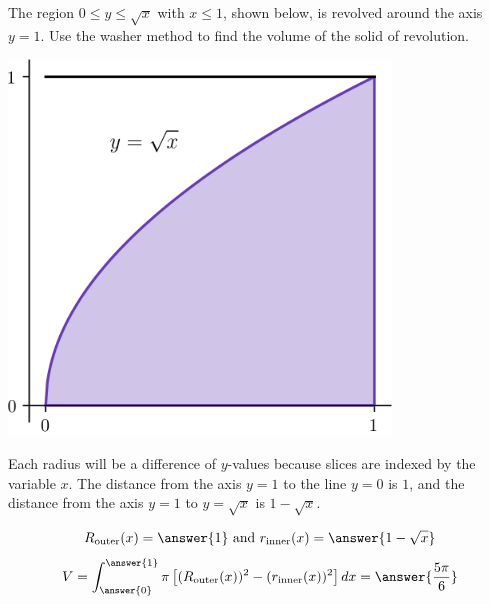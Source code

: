 \documentclass{ximera}
\begin{document}
\begin{problem}
The region $0 \leq y \leq \sqrt{x}$ with $x \leq 1$, shown below, is revolved around the axis $y=1$. Use the washer method to find the volume of the solid of revolution.
\begin{center}
\begin{image}
\includegraphics[width=4in]{diskwasher/disk03.png}
\end{image}
\end{center}
\begin{hint}
Each radius will be a difference of $y$-values because slices are indexed by the variable $x$.
The distance from the axis $y=1$ to the line $y=0$ is $1$, and the distance from the axis $y=1$ to $y = \sqrt{x}$ is $1 - \sqrt{x}$.
\end{hint}
\begin{prompt}
\[ R_{\mathrm{outer}} (x) = \answer{1} \text{ and } r_{\mathrm{inner}}(x) = \answer{1-\sqrt{x}} \]
\[ V = \int_{\answer{0}}^{\answer{1}} \pi  \left[ (R_{\mathrm{outer}}(x))^2 - (r_{\mathrm{inner}}(x))^2 \right] dx =  \answer{\frac{5\pi}{6}} \]
\end{prompt}
\end{problem}
\end{document}
